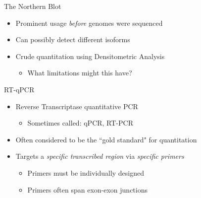 \documentclass[aspectratio=169,11pt]{beamer}
\begin{document}
\begin{frame}{The Northern Blot}
	\begin{itemize}
		\item Prominent usage \textit{before} genomes were sequenced
		\item Can possibly detect different isoforms
		\item Crude quantitation using Densitometric Analysis
		\begin{itemize}
			\item What limitations might this have?
		\end{itemize}
	\end{itemize}
\end{frame}


\begin{frame}{RT-qPCR}

	\begin{itemize}
		\item Reverse Transcriptase quantitative PCR
		\begin{itemize}
			\item Sometimes called: qPCR, RT-PCR
		\end{itemize}
		\item Often considered to be the ``gold standard" for quantitation
		\item Targets a \textit{specific transcribed region} via \textit{specific primers}
		\begin{itemize}
			\item Primers must be individually designed
			\item Primers often span exon-exon junctions
		\end{itemize}
	\end{itemize}

\end{frame}
\end{document}
